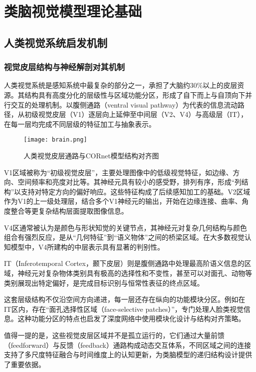 
\chapter{类脑视觉模型理论基础}

\section{人类视觉系统启发机制}

\subsection{视觉皮层结构与神经解剖对其机制}

人类视觉系统是感知系统中最复杂的部分之一，承担了大脑约30\%以上的皮层资源。其结构具有高度分化的层级性与区域功能分区，形成了自下而上与自顶向下并行交互的处理机制。以腹侧通路（ventral visual pathway）为代表的信息流动路径，从初级视觉皮层（V1）逐层向上延伸至中间层（V2、V4）与高级层（IT），在每一层均完成不同层级的特征加工与抽象表示\cite{ kanwisher2010functional}。

\begin{figure}[hbt]
	\centering
	\texttt{[image: brain.png]}
	\caption{人类视觉皮层通路与CORnet模型结构对齐图}
	\label{f.naoquyu}
\end{figure}

V1区域被称为“初级视觉皮层”，主要处理图像中的低级视觉特征，如边缘、方向、空间频率和亮度对比等。其神经元具有较小的感受野，排列有序，形成“列结构”以支持对特定方向的偏好响应。这些特征构成了后续感知加工的基础。V2区域作为V1的上一级处理层，结合多个V1神经元的输出，开始在边缘连接、曲率、角度整合等更复杂结构层面提取图像信息。

V4区通常被认为是颜色与形状知觉的关键节点，其神经元对复杂几何结构与颜色组合有强烈反应，是从“几何特征”到“语义物体”之间的桥梁区域。在大多数视觉认知模型中，V4所建构的中层表示具有显著的判别性。

IT（Inferotemporal Cortex，颞下皮层）则是腹侧通路中处理最高阶语义信息的区域，神经元对复杂物体类别具有极高的选择性和不变性，甚至可以对面孔、动物等类别展现出特定偏好，是完成目标识别与恒常性表征的终点区域。

这套层级结构不仅沿空间方向递进，每一层还存在纵向的功能模块分区。例如在IT区内，存在“面孔选择性区域（face-selective patches）”，专门处理人脸类视觉信息。这种功能分区的特点也启发了深度网络中使用模块化设计与结构对齐策略。

值得一提的是，这些视觉皮层区域并不是孤立运行的，它们通过大量前馈（feedforward）与反馈（feedback）通路构成动态交互体系，不同区域之间的连接支持了多尺度特征融合与时间维度上的认知更新，为类脑模型的递归结构设计提供了重要依据\cite{yamins2016using}。

